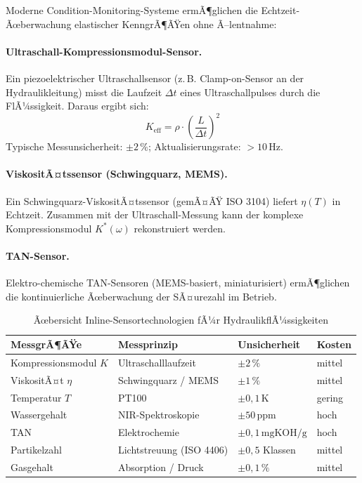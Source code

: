 ﻿\documentclass[a4paper,12pt]{scrreprt}
\theoremstyle{definition}
\begin{document}
Moderne Condition-Monitoring-Systeme ermÃ¶glichen die Echtzeit-Ãœberwachung
elastischer KenngrÃ¶ÃŸen ohne Ã–lentnahme:

\paragraph{Ultraschall-Kompressionsmodul-Sensor.}
Ein piezoelektrischer Ultraschallsensor (z.\,B. Clamp-on-Sensor an
der Hydraulikleitung) misst die Laufzeit $\Delta t$ eines Ultraschallpulses
durch die FlÃ¼ssigkeit. Daraus ergibt sich:
\begin{equation}
  K_{\mathrm{eff}} = \rho \cdot \left(\frac{L}{\Delta t}\right)^2
  \label{eq:ultraschall_sensor}
\end{equation}
Typische Messunsicherheit: $\pm 2\,\%$; Aktualisierungsrate: $> 10\,\mathrm{Hz}$.

\paragraph{ViskositÃ¤tssensor (Schwingquarz, MEMS).}
Ein Schwingquarz-ViskositÃ¤tssensor (gemÃ¤ÃŸ ISO 3104) liefert $\eta(T)$
in Echtzeit. Zusammen mit der Ultraschall-Messung kann der komplexe
Kompressionsmodul $K^*(\omega)$ rekonstruiert werden.

\paragraph{TAN-Sensor.}
Elektro-chemische TAN-Sensoren (MEMS-basiert, miniaturisiert) ermÃ¶glichen
die kontinuierliche Ãœberwachung der SÃ¤urezahl im Betrieb.

\begin{table}[H]
  \centering
  \caption{Ãœbersicht Inline-Sensortechnologien fÃ¼r HydraulikflÃ¼ssigkeiten}
  \label{tab:sensoren}
  \begin{tabular}{p{3.5cm}p{2.8cm}p{2.8cm}p{2.5cm}}
    \toprule
    \textbf{MessgrÃ¶ÃŸe}      & \textbf{Messprinzip}  & \textbf{Unsicherheit}
      & \textbf{Kosten} \\
    \midrule
    Kompressionsmodul $K$  & Ultraschalllaufzeit    & $\pm 2\,\%$     & mittel \\
    ViskositÃ¤t $\eta$      & Schwingquarz / MEMS    & $\pm 1\,\%$     & mittel \\
    Temperatur $T$         & PT100                  & $\pm 0{,}1\,\mathrm{K}$ & gering \\
    Wassergehalt           & NIR-Spektroskopie      & $\pm 50\,\mathrm{ppm}$   & hoch   \\
    TAN                    & Elektrochemie          & $\pm 0{,}1\,\mathrm{mgKOH/g}$ & hoch \\
    Partikelzahl           & Lichtstreuung (ISO 4406)& $\pm 0{,}5$ Klassen & mittel \\
    Gasgehalt              & Absorption / Druck     & $\pm 0{,}1\,\%$ & mittel \\
    \bottomrule
  \end{tabular}
\end{table}
\end{document}
